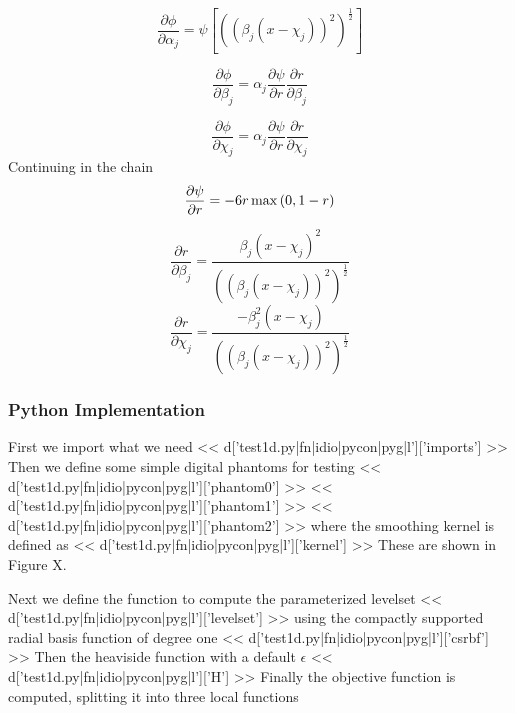 \documentclass[]{article}
\begin{document}
\begin{equation}
\frac{\partial \phi}{\partial \alpha_j} = \psi \left [ ((\beta_j(x-\chi_j))^2)^{\frac{1}{2}}\right ]
\end{equation}

\begin{equation}
\frac{\partial \phi}{\partial \beta_j} = \alpha_j \frac{\partial
  \psi}{\partial r} \frac{\partial r}{\partial \beta_j}
\end{equation}

\begin{equation}
\frac{\partial \phi}{\partial \chi_j} = \alpha_j \frac{\partial
  \psi}{\partial r} \frac{\partial r}{\partial \chi_j}
\end{equation}
Continuing in the chain
\begin{equation}
\frac{\partial \psi}{\partial r} = -6r \max{(0,1-r)}\\
\end{equation}

\begin{equation}
\frac{\partial r}{\partial \beta_j} = 
\frac{\beta_j(x-\chi_j)^2}{((\beta_j(x-\chi_j))^2)^{\frac{1}{2}}}
\end{equation}
\begin{equation}
\frac{\partial r}{\partial \chi_j} = 
\frac{-\beta_j^2(x-\chi_j)}{((\beta_j(x-\chi_j))^2)^{\frac{1}{2}}}
\end{equation}

\subsubsection{Python Implementation}
First we import what we need
<< d['test1d.py|fn|idio|pycon|pyg|l']['imports'] >>
Then we define some simple digital phantoms for testing
<< d['test1d.py|fn|idio|pycon|pyg|l']['phantom0'] >>
<< d['test1d.py|fn|idio|pycon|pyg|l']['phantom1'] >>
<< d['test1d.py|fn|idio|pycon|pyg|l']['phantom2'] >>
where the smoothing kernel is defined as
<< d['test1d.py|fn|idio|pycon|pyg|l']['kernel'] >>
These are shown in Figure X.

Next we define the function to compute the parameterized levelset
<< d['test1d.py|fn|idio|pycon|pyg|l']['levelset'] >>
using the compactly supported radial basis function of degree one
<< d['test1d.py|fn|idio|pycon|pyg|l']['csrbf'] >>
Then the heaviside function with a default \( \epsilon \)
<< d['test1d.py|fn|idio|pycon|pyg|l']['H'] >>
Finally the objective function is computed, splitting it into three
local functions
\end{document}
